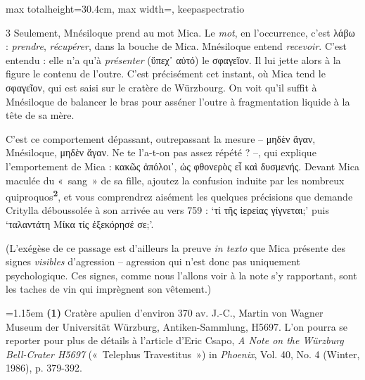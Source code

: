 \documentclass[11pt,twoside]{book}
\newcommand{\italique}[1]{\textit{#1}}
\newcommand{\marqueur}[1]{\textsuperscript{\color{rubricRed}\textbf{#1}}}
\begin{document}
\begin{adjustbox}{max totalheight=30.4cm, max width=\textwidth, keepaspectratio}
\begin{minipage}{\textwidth}
{\begin{multicols}{3}
\noindent Seulement, Mnésiloque prend au mot Mica. Le \italique{mot}, en l'occurrence, c'est λάβω : \italique{prendre}, \italique{récupérer}, dans la bouche de Mica. Mnésiloque entend \italique{recevoir}. C'est entendu : elle n'a qu'à \italique{présenter} (ὕπεχ᾽ αὐτό) le σφαγεῖον. Il lui jette alors à la figure le contenu de l'outre. C'est précisément cet instant, où Mica tend le σφαγεῖον, qui est saisi sur le cratère de Würzbourg. On voit qu'il suffit à Mnésiloque de balancer le bras pour asséner l'outre à fragmentation liquide à la tête de sa mère.
\par\vspace{1.5pt}
\noindent C'est ce comportement dépassant, outrepassant la mesure -- μηδὲν ἄγαν, Mnésiloque, μηδὲν ἄγαν. Ne te l'a-t-on pas assez répété ? --, qui explique l'emportement de Mica : κακῶς ἀπόλοι᾽, ὡς φθονερὸς εἶ καὶ δυσμενής. Devant Mica maculée du «~sang~» de sa fille, ajoutez la confusion induite par les nombreux quiproquos\marqueur{2}, et vous comprendrez aisément les quelques précisions que demande Critylla déboussolée à son arrivée au vers 759 : `τί τῆς ἱερείας γίγνεται;' puis `ταλαντάτη Μίκα τίς ἐξεκόρησέ σε;'.
\par\vspace{1.5pt}
\noindent (L'exégèse de ce passage est d'ailleurs la preuve \italique{in texto} que Mica présente des signes \italique{visibles} d'agression -- agression qui n'est donc pas uniquement psychologique. Ces signes, comme nous l'allons voir à la note s'y rapportant, sont les taches de vin qui imprègnent son vêtement.)
\par\vspace{1.5pt}
\par\vspace{1.2pt}\par\nopagebreak\vspace{1pt}\noindent\hangindent=1.15em {\color{sepiaNote}\textbf{(1)}} Cratère apulien d'environ 370 av. J.-C., Martin von Wagner Museum der Universität Würzburg, Antiken-Sammlung, H5697. L'on pourra se reporter pour plus de détails à l'article d'Eric Csapo, \italique{A Note on the Würzburg Bell-Crater H5697} («~Telephus Travestitus~») in \italique{Phoenix}, Vol. 40, No. 4 (Winter, 1986), p. 379-392.
\par\vspace{1.5pt}

\end{multicols}}
\end{minipage}
\end{adjustbox}
\end{document}
